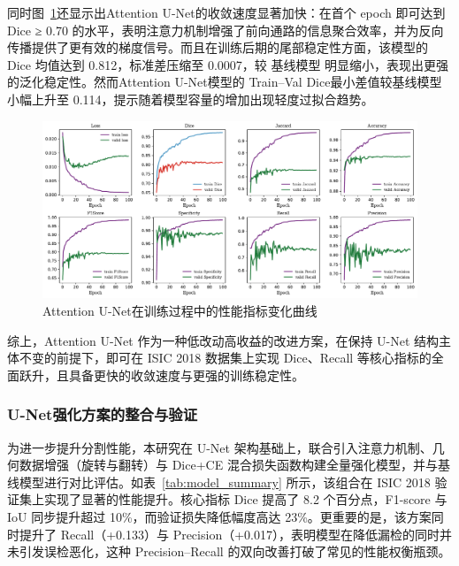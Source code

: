 同时图~\ref{fig:attunet}还显示出Attention U-Net的收敛速度显著加快：在首个 epoch 即可达到 Dice ≥ 0.70 的水平，表明注意力机制增强了前向通路的信息聚合效率，并为反向传播提供了更有效的梯度信号。而且在训练后期的尾部稳定性方面，该模型的 Dice 均值达到 0.812，标准差压缩至 0.0007，较 基线模型 明显缩小，表现出更强的泛化稳定性。然而Attention U-Net模型的 Train–Val Dice最小差值较基线模型小幅上升至 0.114，提示随着模型容量的增加出现轻度过拟合趋势。

\begin{figure}[!htbp]
    \centering
    \includegraphics[width=\textwidth]{fig/attunet_metrics.pdf}
    \caption{Attention U-Net在训练过程中的性能指标变化曲线}
    \label{fig:attunet}
\end{figure}

综上，Attention U-Net 作为一种低改动高收益的改进方案，在保持 U-Net 结构主体不变的前提下，即可在 ISIC 2018 数据集上实现 Dice、Recall 等核心指标的全面跃升，且具备更快的收敛速度与更强的训练稳定性。

\subsubsection{U-Net强化方案的整合与验证}

为进一步提升分割性能，本研究在 U-Net 架构基础上，联合引入注意力机制、几何数据增强（旋转与翻转）与 Dice+CE 混合损失函数构建全量强化模型，并与基线模型进行对比评估。如表~\ref{tab:model_summary} 所示，该组合在 ISIC 2018 验证集上实现了显著的性能提升。核心指标 Dice 提高了 8.2 个百分点，F1-score 与 IoU 同步提升超过 10\%，而验证损失降低幅度高达 23\%。更重要的是，该方案同时提升了 Recall（+0.133）与 Precision（+0.017），表明模型在降低漏检的同时并未引发误检恶化，这种 Precision–Recall 的双向改善打破了常见的性能权衡瓶颈。

